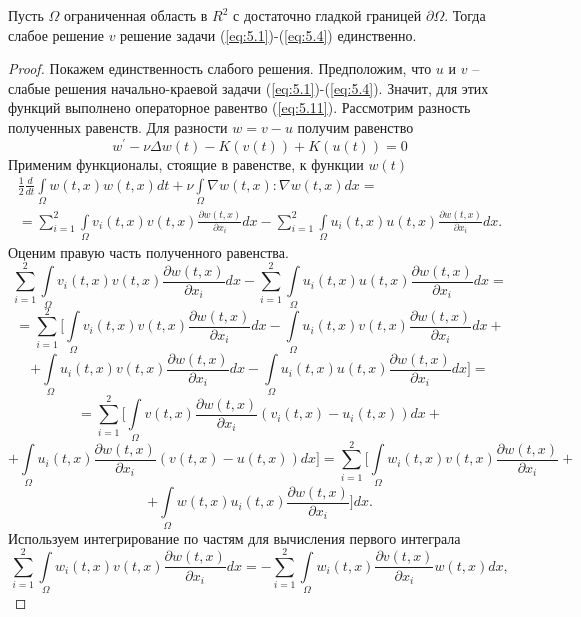 \begin{theorem}
    Пусть $\Omega$ ограниченная область в $R^2$ с достаточно гладкой границей $\partial\Omega$. Тогда слабое решение $v$  решение
    задачи (\ref{eq:5.1})-(\ref{eq:5.4}) единственно.
\end{theorem}
\begin{proof}
    Покажем единственность слабого решения. Предположим, что $u$ и $v$ -- слабые решения начально-краевой задачи (\ref{eq:5.1})-(\ref{eq:5.4}).
    Значит, для этих функций выполнено операторное равентво (\ref{eq:5.11}). Рассмотрим разность полученных равенств. 
    Для разности $w = v - u$ получим равенство
    $$w^\prime - \nu\Delta w(t) - K(v(t)) + K(u(t)) = 0$$
    Применим функционалы, стоящие в равенстве, к функции $w(t)$
    \begin{equation}\label{eq:5.36}
        \begin{gathered}
            \frac{1}{2}\frac{d}{dt}\int\limits_\Omega w(t, x)w(t, x)dt+\nu\int\limits_{\Omega} \nabla w(t,x):\nabla w(t,x)dx= \\
            =\sum_{i=1}^{2}\int\limits_\Omega v_i(t,x) v(t, x)\frac{\partial w(t, x)}{\partial x_i}dx-\sum_{i=1}^{2}\int\limits_\Omega u_i(t,x)u(t, x)\frac{\partial w(t, x)}{\partial x_i}dx.
        \end{gathered}
    \end{equation}
    Оценим правую часть полученного равенства.
    $$\sum_{i=1}^{2}\int\limits_\Omega v_i(t,x) v(t, x)\frac{\partial w(t, x)}{\partial x_i}dx-
    \sum_{i=1}^{2}\int\limits_\Omega u_i(t,x)u(t, x)\frac{\partial w(t, x)}{\partial x_i}dx=$$
    $$=\sum_{i=1}^{2}\bigg[\int\limits_\Omega v_i(t,x)v(t, x)\frac{\partial w(t, x)}{\partial x_i}dx-
    \int\limits_\Omega u_i(t,x)v(t, x)\frac{\partial w(t, x)}{\partial x_i}dx+$$
    $$+\int\limits_\Omega u_i(t,x) v(t, x)\frac{\partial w(t, x)}{\partial x_i}dx-
    \int\limits_\Omega u_i(t,x) u(t, x)\frac{\partial w(t, x)}{\partial x_i}dx\bigg]=$$
    $$=\sum_{i=1}^{2}\bigg[\int\limits_\Omega v(t, x)\frac{\partial w(t, x)}{\partial x_i}(v_i(t,x)-u_i(t,x))dx+$$
    $$+\int\limits_\Omega u_i(t,x) \frac{\partial w(t, x)}{\partial x_i}(v(t,x)-u(t,x))dx\bigg]=
    \sum_{i=1}^{2}\bigg[\int\limits_\Omega w_i(t,x)v(t,x)\frac{\partial w(t, x)}{\partial x_i}+$$
    $$+\int\limits_\Omega w(t,x)u_i(t,x)\frac{\partial w(t, x)}{\partial x_i}\bigg]dx.$$
    Используем интегрирование по частям для вычисления первого интеграла
    $$\sum_{i=1}^{2}\int\limits_\Omega w_i(t, x)v(t, x)\frac{\partial w(t, x)}{\partial x_i}dx=
    -\sum_{i=1}^{2}\int\limits_\Omega w_i(t, x)\frac{\partial v(t, x)}{\partial x_i}w(t, x)dx,$$

\end{proof}
